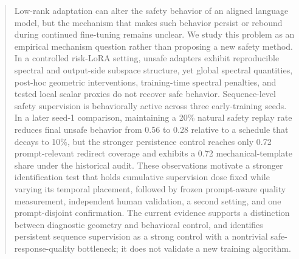 \begin{abstract}
Low-rank adaptation can alter the safety behavior of an aligned language model, but the mechanism that makes such behavior persist or rebound during continued fine-tuning remains unclear. We study this problem as an empirical mechanism question rather than proposing a new safety method. In a controlled \modelname{} risk-LoRA setting, unsafe adapters exhibit reproducible spectral and output-side subspace structure, yet global spectral quantities, post-hoc geometric interventions, training-time spectral penalties, and tested local scalar proxies do not recover safe behavior. Sequence-level safety supervision is behaviorally active across three early-training seeds. In a later seed-1 comparison, maintaining a 20\% natural safety replay rate reduces final unsafe behavior from 0.56 to 0.28 relative to a schedule that decays to 10\%, but the stronger persistence control reaches only 0.72 prompt-relevant redirect coverage and exhibits a 0.72 mechanical-template share under the historical audit. These observations motivate a stronger identification test that holds cumulative supervision dose fixed while varying its temporal placement, followed by frozen prompt-aware quality measurement, independent human validation, a second setting, and one prompt-disjoint confirmation.  The current evidence supports a distinction between diagnostic geometry and behavioral control, and identifies persistent sequence supervision as a strong control with a nontrivial safe-response-quality bottleneck; it does not validate a new training algorithm.
\end{abstract}

